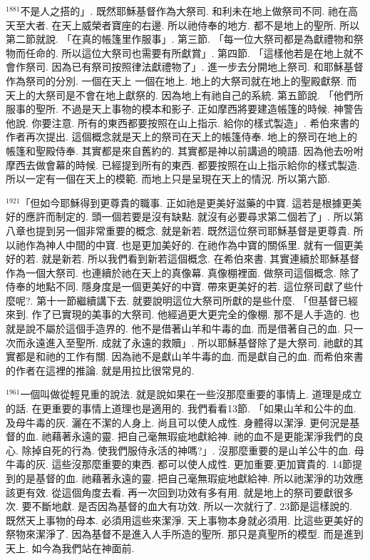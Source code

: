 \documentclass{book}
\begin{document}
$^{1881}$不是人之搭的」.
既然耶穌基督作為大祭司.
和利未在地上做祭司不同.
祂在高天至大者.
在天上威榮者寶座的右邊.
所以祂侍奉的地方.
都不是地上的聖所.
所以第二節就說.
「在真的帳篷里作服事」.
第三節.
「每一位大祭司都是為獻禮物和祭物而任命的.
所以這位大祭司也需要有所獻賞」.
第四節.
「這樣他若是在地上就不會作祭司.
因為已有祭司按照律法獻禮物了」.
進一步去分開地上祭司.
和耶穌基督作為祭司的分別.
一個在天上 一個在地上.
地上的大祭司就在地上的聖殿獻祭.
而天上的大祭司是不會在地上獻祭的.
因為地上有祂自己的系統.
第五節說.
「他們所服事的聖所.
不過是天上事物的模本和影子.
正如摩西將要建造帳篷的時候.
神警告他說.
你要注意.
所有的東西都要按照在山上指示.
給你的樣式製造」.
希伯來書的作者再次提出.
這個概念就是天上的祭司在天上的帳篷侍奉.
地上的祭司在地上的帳篷和聖殿侍奉.
其實都是來自舊約的.
其實都是神以前講過的曉語.
因為他去吩咐摩西去做會幕的時候.
已經提到所有的東西.
都要按照在山上指示給你的樣式製造.
所以一定有一個在天上的模範.
而地上只是呈現在天上的情況.
所以第六節.

$^{1921}$「但如今耶穌得到更尊貴的職事.
正如祂是更美好滋藥的中寶.
這若是根據更美好的應許而制定的.
頭一個若要是沒有缺點.
就沒有必要尋求第二個若了」.
所以第八章也提到另一個非常重要的概念.
就是新若.
既然這位祭司耶穌基督是更尊貴.
所以祂作為神人中間的中寶.
也是更加美好的.
在祂作為中寶的關係里.
就有一個更美好的若.
就是新若.
所以我們看到新若這個概念.
在希伯來書.
其實連續於耶穌基督作為一個大祭司.
也連續於祂在天上的真像幕.
真像棚裡面.
做祭司這個概念.
除了侍奉的地點不同.
隱身度是一個更美好的中寶.
帶來更美好的若.
這位祭司獻了些什麼呢?.
第十一節繼續講下去.
就要說明這位大祭司所獻的是些什麼.
「但基督已經來到.
作了已實現的美事的大祭司.
他經過更大更完全的像棚.
那不是人手造的.
也就是說不屬於這個手造界的.
他不是借著山羊和牛毒的血.
而是借著自己的血.
只一次而永遠進入至聖所.
成就了永遠的救贖」.
所以耶穌基督除了是大祭司.
祂獻的其實都是和祂的工作有關.
因為祂不是獻山羊牛毒的血.
而是獻自己的血.
而希伯來書的作者在這裡的推論.
就是用拉比很常見的.

$^{1961}$一個叫做從輕見重的說法.
就是說如果在一些沒那麼重要的事情上.
道理是成立的話.
在更重要的事情上道理也是適用的.
我們看看13節.
「如果山羊和公牛的血.
及母牛毒的灰.
灑在不潔的人身上.
尚且可以使人成性.
身體得以潔淨.
更何況是基督的血.
祂藉著永遠的靈.
把自己毫無瑕疵地獻給神.
祂的血不是更能潔淨我們的良心.
除掉自死的行為.
使我們服侍永活的神嗎?」.
沒那麼重要的是山羊公牛的血.
母牛毒的灰.
這些沒那麼重要的東西.
都可以使人成性.
更加重要,更加寶貴的.
14節提到的是基督的血.
祂藉著永遠的靈.
把自己毫無瑕疵地獻給神.
所以祂潔淨的功效應該更有效.
從這個角度去看.
再一次回到功效有多有用.
就是地上的祭司要獻很多次.
要不斷地獻.
是否因為基督的血大有功效.
所以一次就行了.
23節是這樣說的.
既然天上事物的母本.
必須用這些來潔淨.
天上事物本身就必須用.
比這些更美好的祭物來潔淨了.
因為基督不是進入人手所造的聖所.
那只是真聖所的模型.
而是進到天上.
如今為我們站在神面前.
\end{document}
